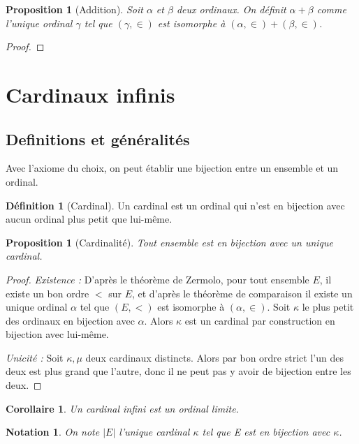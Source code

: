 \documentclass{article}
\theoremstyle{definition}
\newtheorem{definition}[subsubsection]{Définition}
\theoremstyle{plain}
\newtheorem{proposition}[subsubsection]{Proposition}
\theoremstyle{plain}
\newtheorem{corollary}[subsubsection]{Corollaire}
\theoremstyle{plain}
\theoremstyle{plain}
\theoremstyle{plain}
\newtheorem*{notation}{Notation}
\begin{document}
\begin{proposition}[Addition]
	Soit \( \alpha \) et \( \beta \) deux ordinaux. 
	On définit \( \alpha + \beta \) comme l'unique ordinal \( \gamma \) tel que \( (\gamma,\in) \) est isomorphe à \( (\alpha,\in) + (\beta,\in) \).
\end{proposition}
\begin{proof}
	
\end{proof}

\clearpage
\section{Cardinaux infinis}
\subsection{Definitions et généralités}

\par Avec l'axiome du choix, on peut établir une bijection entre un ensemble et un ordinal.

\begin{definition}[Cardinal]
	Un cardinal est un ordinal qui n'est en bijection avec aucun ordinal plus petit que lui-même.
\end{definition}

\begin{proposition}[Cardinalité]
	Tout ensemble est en bijection avec un unique cardinal.
\end{proposition}
\begin{proof}	
	\textit{Existence :} D'après le théorème de Zermolo, pour tout ensemble \( E \), il existe un bon ordre \( < \) sur \( E \), et d'après le théorème de comparaison il existe un unique ordinal \( \alpha \) tel que \( (E,<) \) est isomorphe à \( (\alpha,\in) \). Soit \( \kappa \) le plus petit des ordinaux en bijection avec \( \alpha \). Alors \( \kappa \) est un cardinal par construction en bijection avec lui-même. 

	\textit{Unicité : } Soit \( \kappa, \mu \) deux cardinaux distincts. Alors par bon ordre strict l'un des deux est plus grand que l'autre, donc il ne peut pas y avoir de bijection entre les deux.
\end{proof}

\begin{corollary}
	Un cardinal infini est un ordinal limite.
\end{corollary}
\begin{notation}
	On note \( |E| \) l'unique cardinal \( \kappa \) tel que E est en bijection avec \( \kappa \).
\end{notation}
\end{document}
